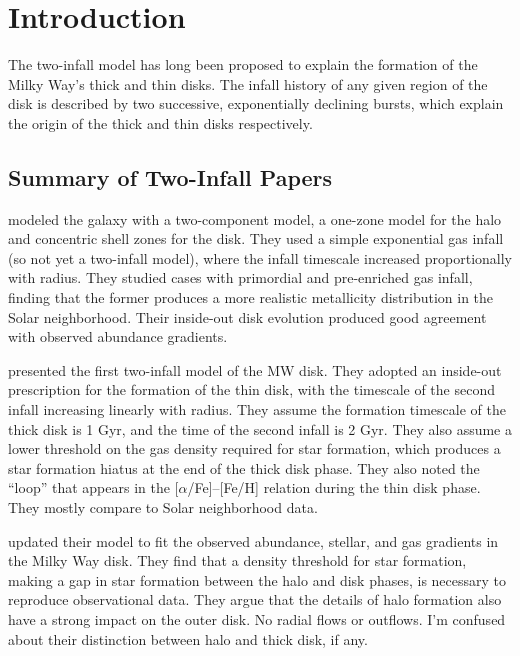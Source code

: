 \documentclass[twocolumn,twocolappendix,linenumbers]{aastex631}
\newcommand{\aFe}{[$\alpha$/Fe]\xspace}
\begin{document}
\section{Introduction}

The two-infall model has long been proposed to explain the formation of the Milky Way's thick and thin disks. The infall history of any given region of the disk is described by two successive, exponentially declining bursts, which explain the origin of the thick and thin disks respectively.

\subsection{Summary of Two-Infall Papers}


\citet{matteucci_galactic_1989} modeled the galaxy with a two-component model, a one-zone model for the halo and concentric shell zones for the disk. They used a simple exponential gas infall (so not yet a two-infall model), where the infall timescale increased proportionally with radius. They studied cases with primordial and pre-enriched gas infall, finding that the former produces a more realistic metallicity distribution in the Solar neighborhood. Their inside-out disk evolution produced good agreement with observed abundance gradients.

\citet{chiappini_chemical_1997} presented the first two-infall model of the MW disk. They adopted an inside-out prescription for the formation of the thin disk, with the timescale of the second infall increasing linearly with radius. They assume the formation timescale of the thick disk is 1 Gyr, and the time of the second infall is 2 Gyr. They also assume a lower threshold on the gas density required for star formation, which produces a star formation hiatus at the end of the thick disk phase. They also noted the ``loop'' that appears in the \aFe--[Fe/H] relation during the thin disk phase. They mostly compare to Solar neighborhood data.

\citet{chiappini_abundance_2001} updated their model to fit the observed abundance, stellar, and gas gradients in the Milky Way disk. They find that a density threshold for star formation, making a gap in star formation between the halo and disk phases, is necessary to reproduce observational data. They argue that the details of halo formation also have a strong impact on the outer disk. No radial flows or outflows. I'm confused about their distinction between halo and thick disk, if any.
\end{document}
